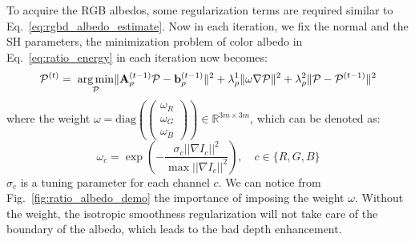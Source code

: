 To acquire the RGB albedos, some regularization terms are required similar to Eq.~\ref{eq:rgbd_albedo_estimate}. Now in each iteration, we fix the normal and the SH parameters, the minimization problem of color albedo in Eq.~\ref{eq:ratio_energy} in each iteration now becomes:
\begin{equation}\label{eq:ratio_albedo_refine}
    \mathcal{P}^{(t)} = \;
    \operatorname*{arg\,min}_{\mathcal{P}} \lVert\mathbf{A}_{\rho}^{(t-1)}\mathcal{P} - \mathbf{b}_{\rho}^{(t-1)}\rVert^2 
    + \lambda_{\rho}^1 \lVert \omega \nabla \mathcal{P} \rVert^2  
    + \lambda_{\rho}^2 \lVert \mathcal{P} - \mathcal{P}^{(t-1)}\rVert^2
\end{equation}
where the weight $\omega = \text{diag}(\begin{pmatrix} \omega_R\\ \omega_G\\ \omega_B \end{pmatrix}) \in \mathbb{R}^{3m \times 3m}$, which can be denoted as:
\begin{equation}
\omega_c = \exp(- \frac{\sigma_c ||\nabla I_c||^2}{\max ||\nabla I_c||^2}), \quad c \in \{R,G,B\}
\end{equation}
$\sigma_c$ is a tuning parameter for each channel $c$.  
We can notice from Fig.~\ref{fig:ratio_albedo_demo} the importance of imposing the weight $\omega$.
Without the weight, the isotropic smoothness regularization will not take care of the boundary of the albedo, which leads to the bad depth enhancement.

